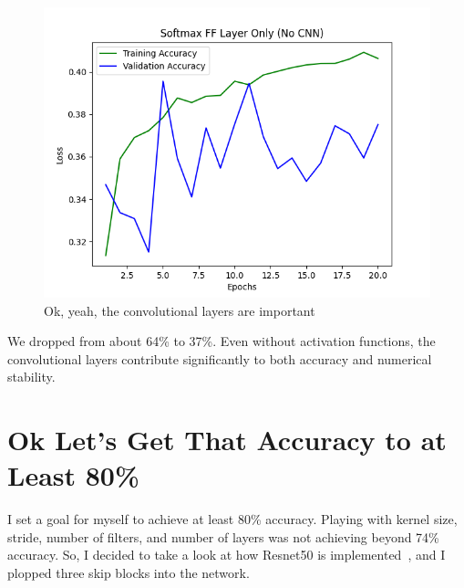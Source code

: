 \documentclass{article}
\begin{document}
    \begin{figure}[!htbp]
        \centerline{\includegraphics[width=0.55\columnwidth]{Softmax FF Layer Only (No CNN)}}
        \caption{Ok, yeah, the convolutional layers are important}
        \label{fig:ya-important}
    \end{figure}

    We dropped from about 64\% to 37\%.
    Even without activation functions, the convolutional layers contribute significantly to both accuracy and numerical stability.


    \section{Ok Let's Get That Accuracy to at Least 80\%}\label{skip-connections}

    I set a goal for myself to achieve at least 80\% accuracy.
    Playing with kernel size, stride, number of filters, and number of layers was not achieving beyond 74\% accuracy.
    So, I decided to take a look at how Resnet50 is implemented~\cite{mukherjee2022annotated}, and I plopped three skip blocks into the network.
\end{document}
